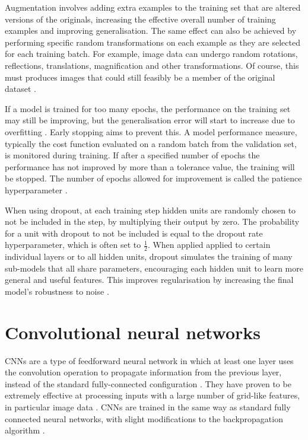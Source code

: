 \documentclass[12pt]{article}
\begin{document}
Augmentation involves adding extra examples to the training set that are altered versions of the originals, increasing the effective overall number of training examples and improving generalisation. The same effect can also be achieved by performing specific random transformations on each example as they are selected for each training batch. For example, image data can undergo random rotations, reflections, translations, magnification and other transformations. Of course, this must produces images that could still feasibly be a member of the original dataset \cite{Goodfellow16}.

If a model is trained for too many epochs, the performance on the training set may still be improving, but the generalisation error will start to increase due to overfitting \cite{Bishop95, Goodfellow16}. Early stopping aims to prevent this. A model performance measure, typically the cost function evaluated on a random batch from the validation set, is monitored during training. If after a specified number of epochs the performance has not improved by more than a tolerance value, the training will be stopped. The number of epochs allowed for improvement is called the patience hyperparameter \cite{Goodfellow16}.

When using dropout, at each training step hidden units are randomly chosen to not be included in the step, by multiplying their output by zero. The probability for a unit with dropout to not be included is equal to the dropout rate hyperparameter, which is often set to $\frac{1}{2}$. When applied applied to certain individual layers or to all hidden units, dropout simulates the training of many sub-models that all share parameters, encouraging each hidden unit to learn more general and useful features. This improves regularisation by increasing the final model's robustness to noise \cite{Srivastava2014}.

\section{Convolutional neural networks}
CNNs are a type of feedforward neural network in which at least one layer uses the convolution operation to propagate information from the previous layer, instead of the standard fully-connected configuration \cite{Goodfellow16}. They have proven to be extremely effective at processing inputs with a large number of grid-like features, in particular image data \cite{Shrestha19}. CNNs are trained in the same way as standard fully connected neural networks, with slight modifications to the backpropagation algorithm \cite{Bengio93}.
\end{document}

